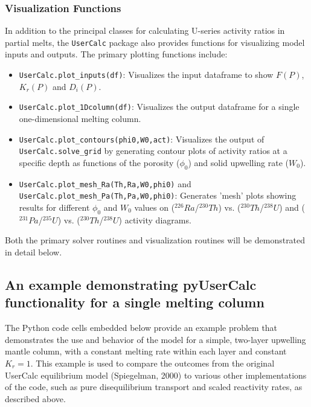 \documentclass[11pt]{article}
\begin{document}
    \hypertarget{visualization-functions}{%
\subsubsection{Visualization Functions}\label{visualization-functions}}

In addition to the principal classes for calculating U-series activity ratios in partial melts, the \colorbox{gray!20}{\texttt{UserCalc}} package also provides functions for visualizing model inputs and outputs. The primary plotting functions include:

\begin{itemize}
	\item \colorbox{gray!20}{\texttt{UserCalc.plot\_inputs(df)}}: Visualizes the input dataframe to show $F(P)$, $K_r(P)$ and $D_i(P)$.
	\item \colorbox{gray!20}{\texttt{UserCalc.plot\_1Dcolumn(df)}}: Visualizes the output dataframe for a single one-dimensional melting column.
	\item \colorbox{gray!20}{\texttt{UserCalc.plot\_contours(phi0,W0,act)}}: Visualizes the output of \colorbox{gray!20}{\texttt{UserCalc.solve\_grid}} by generating contour plots of activity ratios at a specific depth as functions of the porosity ($\phi_0$) and solid upwelling rate ($W_0$).
	\item \colorbox{gray!20}{\texttt{UserCalc.plot\_mesh\_Ra(Th,Ra,W0,phi0)}} and \colorbox{gray!20}{\texttt{UserCalc.plot\_mesh\_Pa(Th,Pa,W0,phi0)}}: Generates 'mesh' plots showing results for different $\phi_0$ and $W_0$ values on ($^{226}Ra$/$^{230}Th$) vs. ($^{230}Th$/$^{238}U$) and ($^{231}Pa$/$^{235}U$) vs. ($^{230}Th$/$^{238}U$) activity diagrams.
\end{itemize}

Both the primary solver routines and visualization routines will be demonstrated in detail below.

    \hypertarget{an-example-demonstrating-pyusercalc-functionality-for-a-single-melting-column}{%
\subsection{An example demonstrating pyUserCalc functionality for a single melting column}\label{an-example-demonstrating-pyusercalc-functionality-for-a-single-melting-column}}

The Python code cells embedded below provide an example problem that demonstrates the use and behavior of the model for a simple, two-layer upwelling mantle column, with a constant melting rate within each layer and constant $K_r=1$. This example is used to compare the outcomes from the original UserCalc equilibrium model (Spiegelman, 2000) to various other implementations of the code, such as pure disequilibrium transport and scaled reactivity rates, as described above.
\end{document}
